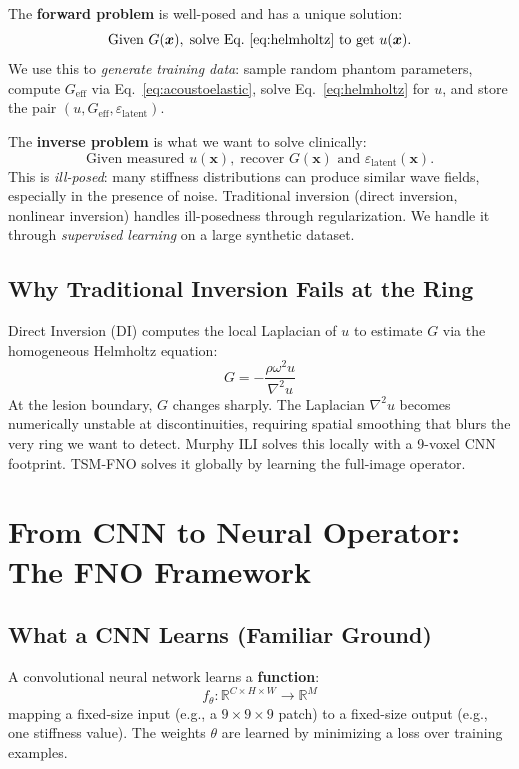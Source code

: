 \documentclass[11pt,letterpaper]{article}
\newcommand{\R}{\mathbb{R}}
\newcommand{\xvec}{\bm{x}}
\newcommand{\Geff}{G_{\mathrm{eff}}}
\newcommand{\eps}{\varepsilon_{\mathrm{latent}}}
\begin{document}
The \textbf{forward problem} is well-posed and has a unique solution:
\[
    \text{Given } G(\xvec),\; \text{solve Eq.~\eqref{eq:helmholtz} to get } u(\xvec).
\]
We use this to \emph{generate training data}: sample random phantom parameters,
compute $\Geff$ via Eq.~\eqref{eq:acoustoelastic}, solve Eq.~\eqref{eq:helmholtz}
for $u$, and store the pair $(u, \Geff, \eps)$.

The \textbf{inverse problem} is what we want to solve clinically:
\[
    \text{Given measured } u(\xvec),\; \text{recover } G(\xvec) \text{ and } \eps(\xvec).
\]
This is \emph{ill-posed}: many stiffness distributions can produce similar wave
fields, especially in the presence of noise. Traditional inversion (direct inversion,
nonlinear inversion) handles ill-posedness through regularization. We handle it
through \emph{supervised learning} on a large synthetic dataset.

\subsection{Why Traditional Inversion Fails at the Ring}

Direct Inversion (DI) computes the local Laplacian of $u$ to estimate $G$ via the
homogeneous Helmholtz equation:
\[
    G = -\frac{\rho\omega^2 u}{\nabla^2 u}
\]
At the lesion boundary, $G$ changes sharply. The Laplacian $\nabla^2 u$ becomes
numerically unstable at discontinuities, requiring spatial smoothing that blurs the
very ring we want to detect. Murphy ILI solves this locally with a 9-voxel CNN
footprint. TSM-FNO solves it globally by learning the full-image operator.

\section{From CNN to Neural Operator: The FNO Framework}

\subsection{What a CNN Learns (Familiar Ground)}

A convolutional neural network learns a \textbf{function}:
\[
    f_\theta : \R^{C \times H \times W} \to \R^{M}
\]
mapping a fixed-size input (e.g., a $9\times9\times9$ patch) to a fixed-size output
(e.g., one stiffness value). The weights $\theta$ are learned by minimizing a loss
over training examples.
\end{document}
